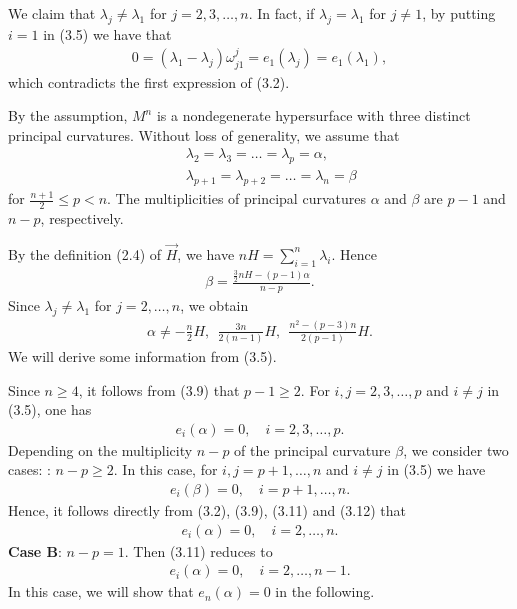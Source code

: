 \documentclass[twoside,reqno,A4]{amsart}
\theoremstyle{definition}
\theoremstyle{remark}
\numberwithin{equation}{section}
\begin{document}
We claim that $\lambda_j\neq\lambda_1$ for $j=2, 3, \ldots, n$. In
fact, if $\lambda_j=\lambda_1$ for $j\neq1$, by putting $i=1$ in
(3.5) we have that
\begin{eqnarray}
0=(\lambda_1-\lambda_j)\omega_{j1}^j=e_1(\lambda_j)=e_1(\lambda_1),
\end{eqnarray}
which contradicts the first expression of (3.2).

By the assumption, $M^n$ is a nondegenerate hypersurface with three
distinct principal curvatures. Without loss of generality, we assume
that
\begin{eqnarray}
&&\lambda_2=\lambda_3=\ldots=\lambda_p=\alpha,\nonumber\\
&&\lambda_{p+1}=\lambda_{p+2}=\ldots=\lambda_n=\beta\nonumber
\end{eqnarray}
for $\frac{n+1}{2}\leq p<n$. The multiplicities of principal
curvatures $\alpha$ and $\beta$ are $p-1$ and $n-p$, respectively.

By the definition (2.4) of $\overrightarrow{H}$, we have
$nH=\sum_{i=1}^n\lambda_i$. Hence
\begin{eqnarray}
\beta=\frac{\frac{3}{2}nH-(p-1)\alpha}{n-p}.
\end{eqnarray}
Since $\lambda_j\neq\lambda_1$ for $j=2,\ldots,n$, we obtain
\begin{eqnarray}
\alpha\neq-\frac{n}{2}H, ~~\frac{3n}{2(n-1)}H,~~
\frac{n^2-(p-3)n}{2(p-1)}H.
\end{eqnarray}
We will derive some information from (3.5).

Since $n\geq4$, it follows from (3.9) that $p-1\geq2$. For $i, j=2,
3,\ldots,p$ and $i\neq j$ in (3.5), one has
\begin{eqnarray}
e_i(\alpha)=0, \quad i=2, 3, \ldots, p.
\end{eqnarray}
Depending on the multiplicity $n-p$ of the principal curvature
$\beta$, we consider two cases: : $n-p\geq2$. In
this case, for $i, j=p+1, \ldots,n$ and $i\neq j$ in (3.5) we have
\begin{eqnarray}
e_i(\beta)=0, \quad i=p+1, \ldots, n.
\end{eqnarray}
Hence, it follows directly from (3.2), (3.9), (3.11) and (3.12) that
\begin{eqnarray}
e_i(\alpha)=0, \quad i=2, \ldots, n.
\end{eqnarray}
{\bf Case B}: $n-p=1$. Then (3.11) reduces to
\begin{eqnarray}
e_i(\alpha)=0, \quad i=2, \ldots, n-1.
\end{eqnarray}
In this case, we will show that $e_n(\alpha)=0$ in the following.
\end{document}
